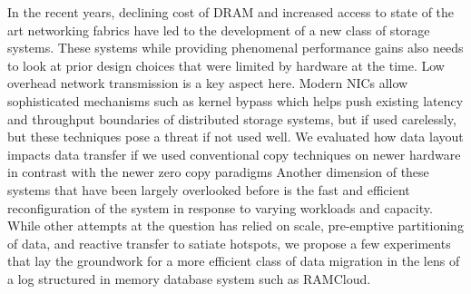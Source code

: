 
In the recent years, declining cost of DRAM and increased access to state 
of the art networking fabrics have led to the development of a new class 
of storage systems. These systems while providing phenomenal performance gains
also needs to look at prior design choices that were limited by hardware at the time.
Low overhead network transmission is a key aspect here. Modern NICs allow sophisticated
mechanisms such as kernel bypass which helps push existing latency and throughput boundaries
of distributed storage systems, but if used carelessly, but these techniques pose a threat 
if not used well. We evaluated how data layout impacts data transfer if we used conventional
copy techniques on newer hardware in contrast with the newer zero copy paradigms
Another dimension of these systems that have been largely  overlooked before is the fast 
and efficient reconfiguration of the system in response to varying workloads and capacity.
While other attempts at the question has relied on scale, pre-emptive partitioning of data,
and reactive transfer to satiate hotspots, we propose a few experiments that lay the groundwork
for a more efficient class of data migration in the lens of a log structured in memory
database system such as RAMCloud.

